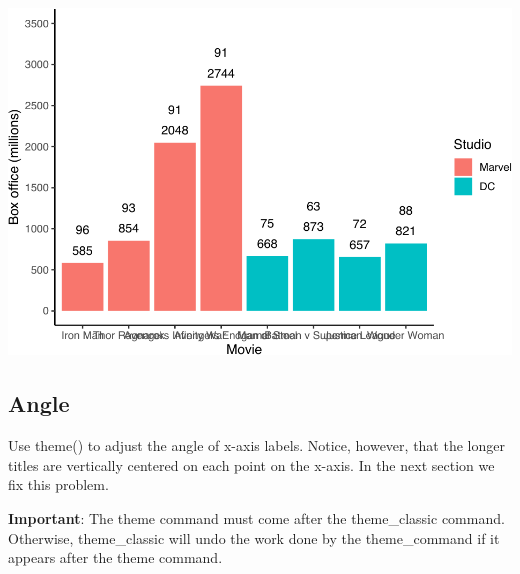 \documentclass[
]{krantz}
\begin{document}
\includegraphics[width=0.65\linewidth]{bookdown_files/figure-latex/unnamed-chunk-276-1}

\hypertarget{angle}{%
\subsection{Angle}\label{angle}}

Use theme() to adjust the angle of x-axis labels. Notice, however, that the longer titles are vertically centered on each point on the x-axis. In the next section we fix this problem.

\textbf{Important}: The theme command must come after the theme\_classic command. Otherwise, theme\_classic will undo the work done by the theme\_command if it appears after the theme command.
\end{document}

